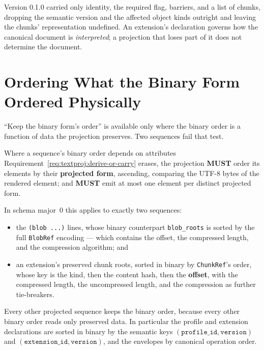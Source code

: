 \documentclass[11pt,letterpaper]{report}
\newcounter{requirement}[chapter]
\newcommand{\MUST}{\textbf{MUST}}
\begin{document}
\begin{rationale}
  Version 0.1.0 carried only identity, the required flag, barriers, and a list of
  chunks, dropping the semantic version and the affected object kinds outright and
  leaving the chunks' representation undefined. An extension's declaration governs
  how the canonical document is \emph{interpreted}; a projection that loses part
  of it does not determine the document.
\end{rationale}

\section{Ordering What the Binary Form Ordered Physically}
\label{sec:content:derived-ordering}

``Keep the binary form's order'' is available only where the binary order is a
function of data the projection preserves. Two sequences fail that test.

\begin{requirement}
  \label{req:textproj:derived-ordering}
  Where a sequence's binary order depends on attributes
  Requirement~\ref{req:textproj:derive-or-carry} erases, the projection \MUST{}
  order its elements by their \textbf{projected form}, ascending, comparing the
  UTF-8 bytes of the rendered element; and \MUST{} emit at most one element per
  distinct projected form.

  In schema major~0 this applies to exactly two sequences:

  \begin{itemize}
    \item the \texttt{(blob ...)} lines, whose binary counterpart
      \texttt{blob\_roots} is sorted by the full \texttt{BlobRef} encoding ---
      which contains the offset, the compressed length, and the compression
      algorithm; and
    \item an extension's preserved chunk roots, sorted in binary by
      \texttt{ChunkRef}'s order, whose key is the kind, then the content hash,
      then the \textbf{offset}, with the compressed length, the uncompressed
      length, and the compression as further tie-breakers.
  \end{itemize}

  Every other projected sequence keeps the binary order, because every other
  binary order reads only preserved data. In particular the profile and extension
  declarations are sorted in binary by the semantic keys
  $(\texttt{profile\_id}, \texttt{version})$ and
  $(\texttt{extension\_id}, \texttt{version})$, and the envelopes by canonical
  operation order.
\end{requirement}
\end{document}
